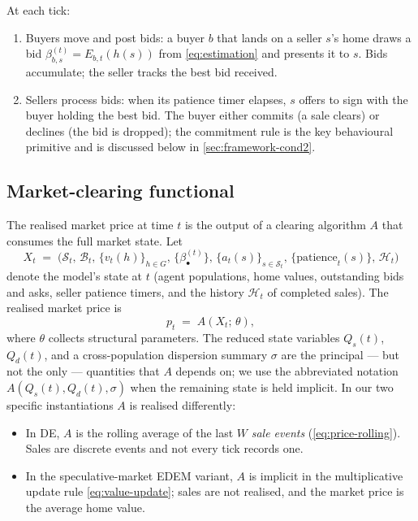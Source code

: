 At each tick:
\begin{enumerate}[leftmargin=*,nosep]
\item Buyers move and post bids: a buyer $b$ that lands on a seller
      $s$'s home draws a bid $\beta_{b,s}^{(t)} = E_{b,t}(h(s))$ from
      \cref{eq:estimation} and presents it to $s$. Bids accumulate;
      the seller tracks the best bid received.
\item Sellers process bids: when its patience timer elapses, $s$
      offers to sign with the buyer holding the best bid. The buyer
      either commits (a sale clears) or declines (the bid is
      dropped); the commitment rule is the key behavioural primitive
      and is discussed below in \cref{sec:framework-cond2}.
\end{enumerate}

\subsection{Market-clearing functional}
\label{sec:framework-clearing}

The realised market price at time $t$ is the output of a clearing
algorithm $A$ that consumes the full market state. Let
\begin{equation}
\label{eq:state}
X_{t} \;=\;
\bigl(\mathcal{S}_{t},\,\mathcal{B}_{t},\,
       \{v_{t}(h)\}_{h \in G},\,
       \{\beta_{\bullet}^{(t)}\},\,
       \{a_{t}(s)\}_{s \in \mathcal{S}_{t}},\,
       \{\text{patience}_{t}(s)\},\,
       \mathcal{H}_{t}\bigr)
\end{equation}
denote the model's state at $t$ (agent populations, home values,
outstanding bids and asks, seller patience timers, and the history
$\mathcal{H}_{t}$ of completed sales). The realised market price is
\begin{equation}
\label{eq:price-functional}
p_{t} \;=\; A(X_{t};\,\theta),
\end{equation}
where $\theta$ collects structural parameters. The reduced state
variables $Q_{s}(t)$, $Q_{d}(t)$, and a cross-population dispersion
summary $\sigma$ are the principal --- but not the only --- quantities
that $A$ depends on; we use the abbreviated notation
$A(Q_{s}(t), Q_{d}(t), \sigma)$ when the remaining state is held
implicit. In our two specific instantiations $A$ is realised
differently:
\begin{itemize}[leftmargin=*,nosep]
\item In DE, $A$ is the rolling average of the last $W$ \emph{sale
      events} (\cref{eq:price-rolling}). Sales are discrete events
      and not every tick records one.
\item In the speculative-market EDEM variant, $A$ is implicit in the
      multiplicative update rule \cref{eq:value-update}; sales are
      not realised, and the market price is the average home value.
\end{itemize}

